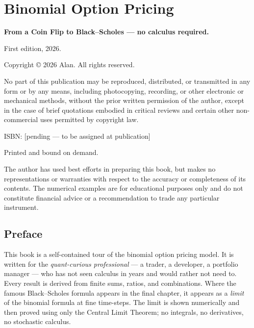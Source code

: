 \documentclass[
  10pt,
  twoside]{book}
\author{}
\date{}
\begin{document}
\frontmatter

{
\setcounter{tocdepth}{1}
\tableofcontents
}
\mainmatter
\chapter{Binomial Option Pricing}\label{binomial-option-pricing}

\textbf{From a Coin Flip to Black--Scholes --- no calculus required.}

First edition, 2026.

Copyright © 2026 Alan. All rights reserved.

No part of this publication may be reproduced, distributed, or
transmitted in any form or by any means, including photocopying,
recording, or other electronic or mechanical methods, without the prior
written permission of the author, except in the case of brief quotations
embodied in critical reviews and certain other non-commercial uses
permitted by copyright law.

ISBN: {[}pending --- to be assigned at publication{]}

Printed and bound on demand.

The author has used best efforts in preparing this book, but makes no
representations or warranties with respect to the accuracy or
completeness of its contents. The numerical examples are for educational
purposes only and do not constitute financial advice or a recommendation
to trade any particular instrument.

\newpage

\section{Preface}\label{preface}

This book is a self-contained tour of the binomial option pricing model.
It is written for the \emph{quant-curious professional} --- a trader, a
developer, a portfolio manager --- who has not seen calculus in years
and would rather not need to. Every result is derived from finite sums,
ratios, and combinations. Where the famous Black--Scholes formula
appears in the final chapter, it appears as a \emph{limit} of the
binomial formula at fine time-steps. The limit is shown numerically and
then proved using only the Central Limit Theorem; no integrals, no
derivatives, no stochastic calculus.
\end{document}
